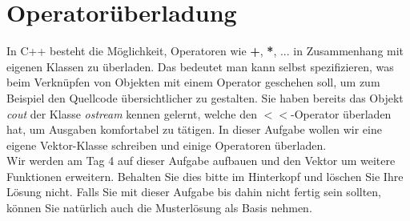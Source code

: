 \documentclass[
  accentcolor=tud1c,	%
  colorbacktitle,		%
  inverttitle,			%
  german,				%
  twoside
]{tudexercise}
\begin{document}
\section{Operatorüberladung} 
In C++ besteht die Möglichkeit, Operatoren wie \textbf{+}, \textbf{*}, ... in Zusammenhang mit eigenen Klassen zu überladen. Das bedeutet man kann selbst spezifizieren, was beim Verknüpfen von Objekten mit einem Operator geschehen soll, um zum Beispiel den Quellcode übersichtlicher zu gestalten. Sie haben bereits das Objekt \emph{cout} der Klasse \emph{ostream} kennen gelernt, welche den $<<$-Operator überladen hat, um Ausgaben komfortabel zu tätigen. In dieser Aufgabe wollen wir eine eigene Vektor-Klasse schreiben und einige Operatoren überladen.\\

Wir werden am Tag 4 auf dieser Aufgabe aufbauen und den Vektor um weitere Funktionen erweitern. Behalten Sie dies bitte im Hinterkopf und löschen Sie Ihre Lösung nicht. Falls Sie mit dieser Aufgabe bis dahin nicht fertig sein sollten, können Sie natürlich auch die Musterlösung als Basis nehmen.
\end{document}
